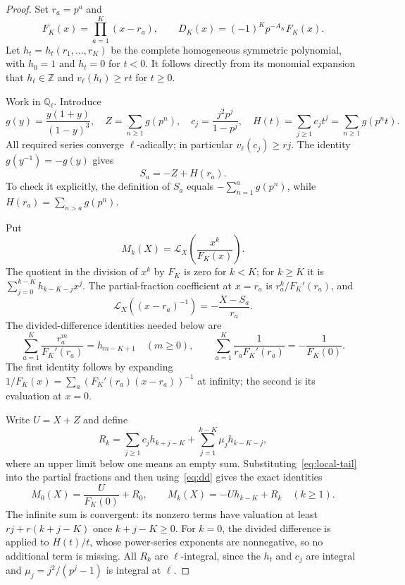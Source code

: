 \documentclass[11pt,letterpaper]{article}
\numberwithin{equation}{section}
\theoremstyle{remark}
\newcommand{\Z}{\mathbb Z}
\newcommand{\Q}{\mathbb Q}
\newcommand{\Lcal}{\mathcal L}
\begin{document}
\begin{proof}
Set $r_a=p^a$ and
\begin{equation*}
 F_K(x)=\prod_{a=1}^K(x-r_a),\qquad
 D_K(x)=(-1)^Kp^{-A_K}F_K(x).
\end{equation*}
Let $h_t=h_t(r_1,\ldots,r_K)$ be the complete homogeneous symmetric polynomial, with $h_0=1$ and $h_t=0$ for $t<0$. It follows directly from its monomial expansion that $h_t\in\Z$ and $v_\ell(h_t)\ge rt$ for $t\ge0$.

Work in $\Q_\ell$. Introduce
\begin{equation*}
 g(y)=\frac{y(1+y)}{(1-y)^3},\quad
 Z=\sum_{n\ge1}g(p^n),\quad
 c_j=\frac{j^2p^j}{1-p^j},\quad
 H(t)=\sum_{j\ge1}c_jt^j=\sum_{n\ge1}g(p^nt).
\end{equation*}
All required series converge $\ell$-adically; in particular $v_\ell(c_j)\ge rj$. The identity $g(y^{-1})=-g(y)$ gives
\begin{equation}\label{eq:local-tail}
 S_a=-Z+H(r_a).
\end{equation}
To check it explicitly, the definition of $S_a$ equals $-\sum_{n=1}^ag(p^n)$, while $H(r_a)=\sum_{n>a}g(p^n)$.

Put
\begin{equation*}
 M_k(X)=\Lcal_X\left(\frac{x^k}{F_K(x)}\right).
\end{equation*}
The quotient in the division of $x^k$ by $F_K$ is zero for $k<K$; for $k\ge K$ it is $\sum_{j=0}^{k-K}h_{k-K-j}x^j$. The partial-fraction coefficient at $x=r_a$ is $r_a^k/F_K'(r_a)$, and
\begin{equation*}
 \Lcal_X((x-r_a)^{-1})=-\frac{X-S_a}{r_a}.
\end{equation*}
The divided-difference identities needed below are
\begin{equation}\label{eq:dd}
 \sum_{a=1}^K\frac{r_a^m}{F_K'(r_a)}=h_{m-K+1}\quad(m\ge0),
 \qquad
 \sum_{a=1}^K\frac1{r_aF_K'(r_a)}=-\frac1{F_K(0)}.
\end{equation}
The first identity follows by expanding $1/F_K(x)=\sum_a(F_K'(r_a)(x-r_a))^{-1}$ at infinity; the second is its evaluation at $x=0$.

Write $U=X+Z$ and define
\begin{equation}\label{eq:Rk}
 R_k=\sum_{j\ge1}c_jh_{k+j-K}
       +\sum_{j=1}^{k-K}\mu_jh_{k-K-j},
\end{equation}
where an upper limit below one means an empty sum. Substituting~\eqref{eq:local-tail} into the partial fractions and then using~\eqref{eq:dd} gives the exact identities
\begin{equation}\label{eq:Mk}
 M_0(X)=\frac{U}{F_K(0)}+R_0,\qquad
 M_k(X)=-Uh_{k-K}+R_k\quad(k\ge1).
\end{equation}
The infinite sum is convergent: its nonzero terms have valuation at least $rj+r(k+j-K)$ once $k+j-K\ge0$. For $k=0$, the divided difference is applied to $H(t)/t$, whose power-series exponents are nonnegative, so no additional term is missing. All $R_k$ are $\ell$-integral, since the $h_t$ and $c_j$ are integral and $\mu_j=j^2/(p^j-1)$ is integral at $\ell$.


\end{proof}
\end{document}
